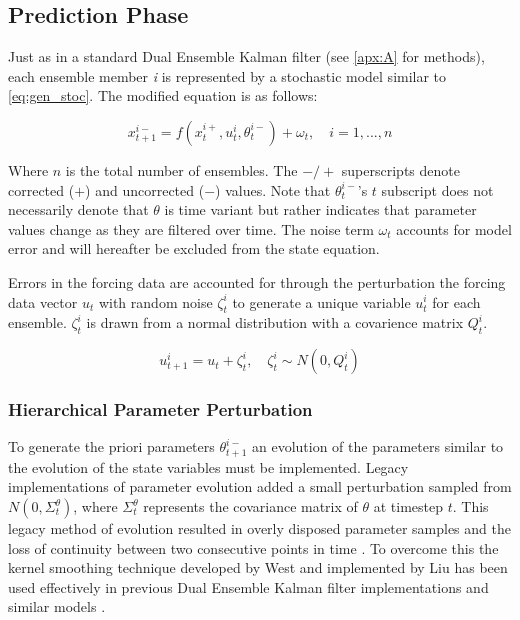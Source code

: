 \subsection{Prediction Phase}

Just as in a standard Dual Ensemble Kalman filter (see \autoref{apx:A} for methods), each ensemble member \textit{i} is represented by a stochastic model similar to \eqref{eq:gen_stoc}. The modified equation is as follows:

\begin{equation}\label{eq:hdekf_predict}
x_{t+1}^{i-} = f(x_{t}^{i+}, u_{t}^{i}, \theta^{i-}_{t}) + \omega_{t}, \quad i=1,...,n
\end{equation}

Where $n$ is the total number of ensembles. The $-/+$ superscripts denote corrected ($+$) and uncorrected ($-$) values. Note that $\theta^{i-}_{t}$'s $t$ subscript does not necessarily denote that $\theta$ is time variant but rather indicates that parameter values change as they are filtered over time. The noise term $\omega_{t}$ accounts for model error and will hereafter be excluded from the state equation.

Errors in the forcing data are accounted for through the perturbation the forcing data vector $u_{t}$ with random noise $\zeta_{t}^{i}$ to generate a unique variable $u_{t}^{i}$ for each ensemble. $\zeta_{t}^{i}$ is drawn from a normal distribution with a covarience matrix $Q_{t}^{i}$.

\begin{equation}\label{eq:hdekf_u}
u_{t+1}^{i} = u_{t} + \zeta_{t}^{i}, \quad \zeta_{t}^{i} \sim N(0,Q_{t}^{i}) 
\end{equation}

\subsubsection{Hierarchical Parameter Perturbation}

To generate the priori parameters $\theta^{i-}_{t+1}$ an evolution of the parameters similar to the evolution of the state variables must be implemented. Legacy implementations of parameter evolution added a small perturbation sampled from $N(0,\Sigma^{\theta}_{t})$, where $\Sigma^{\theta}_{t}$ represents the covariance matrix of $\theta$ at timestep $t$. This legacy method of evolution resulted in overly disposed parameter samples and the loss of continuity between two consecutive points in time \cite{Liu2000} \cite{Chen2008}. To overcome this the kernel smoothing technique developed by West \cite{West1993} and implemented by Liu \cite{Liu2000} has been used effectively in previous Dual Ensemble Kalman filter implementations \cite{Moradkhani2005} and similar models \cite{Chen2008}.

